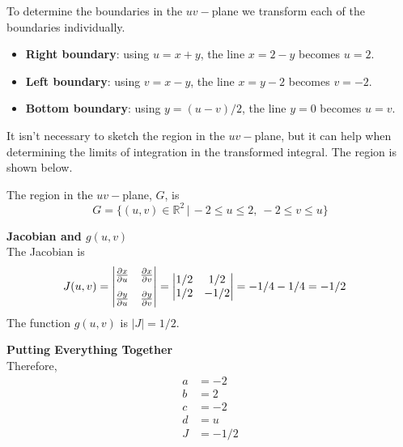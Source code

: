 {    To determine the boundaries in the $uv-$plane we transform each of the boundaries individually. 
    \begin{itemize}
        \item \textbf{Right boundary}: using $u=x+y$, the line $x=2-y$ becomes $u=2$. 
        \item \textbf{Left boundary}: using $v=x-y$, the line $x=y-2$ becomes $v=-2$. 
        \item \textbf{Bottom boundary}: using $y=(u-v)/2$, the line $y=0$ becomes $u=v$.
    \end{itemize}
    It isn't necessary to sketch the region in the $uv-$plane, but it can help when determining the limits of integration in the transformed integral. The region is shown below. 
    \begin{center}     
    \end{center}         
    The region in the $uv-$plane, $G$, is 
    $$G = \{(u,v) \in \mathbb R^2 \, | \, -2 \le u \le 2, \ -2 \le v \le u \}$$
    
    \textbf{Jacobian and $g(u,v)$ }\\
    The Jacobian is
    \begin{align}
        J(u,v) 
        & = \begin{vmatrix} \frac{\partial x}{\partial u} & \frac{\partial x}{\partial v} \\[8pt] \frac{\partial y}{\partial u} & \frac{\partial y}{\partial v} \end{vmatrix} 
        = \begin{vmatrix} 1/2 & 1/2 \\ 1/2 & -1/2 \end{vmatrix} 
        = -1/4 - 1/4 = - 1/2
    \end{align}      
    The function $g(u,v)$ is $|J| = 1/2$.    
    \vspace{12pt}
    
    \textbf{Putting Everything Together}\\
    Therefore, 
    \begin{align}
        a & = -2 \\
        b &= 2 \\
        c &= -2 \\
        d &= u \\
        J &= -1/2
    \end{align}

    }
   \else

   \fi
\fi 


